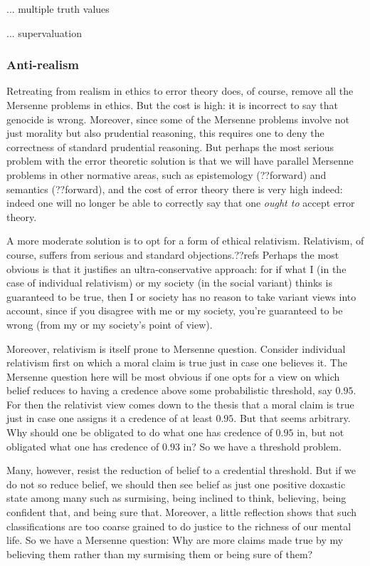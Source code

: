 ... multiple truth values

... supervaluation
\subsubsection{Anti-realism}
Retreating from realism in ethics to error theory does, of course, remove all the Mersenne problems in ethics. But the
cost is high: it is incorrect to say that genocide is wrong. Moreover, since some of the Mersenne problems involve not
just morality but also prudential reasoning, this requires one to deny the correctness of standard prudential reasoning.
But perhaps the most serious problem with the error theoretic solution is that we will have parallel Mersenne problems
in other normative areas, such as epistemology (??forward) and semantics (??forward), and the cost of error theory 
there is very high indeed: indeed one will no longer  be able to correctly say that one \textit{ought to} accept error theory.

A more moderate solution is to opt for a form of ethical relativism. Relativism, of course, suffers from serious and
standard objections.??refs Perhaps the most obvious is that it justifies an ultra-conservative approach: for if what
I (in the case of individual relativism) or my society (in the social variant) thinks is guaranteed to be true, then
I or society has no reason to take variant views into account, since if you disagree with me or my society, you're guaranteed to be 
wrong (from my or my society's point of view).

Moreover, relativism is itself prone to
Mersenne question. Consider individual relativism first on which a moral claim is true just in case one believes
it. The Mersenne question here will be most obvious if one opts for a view on which belief reduces to having a
credence above some probabilistic threshold, say $0.95$. For then the relativist view comes down to the thesis
that a moral claim is true just in case one assigns it a credence of at least $0.95$. But that seems arbitrary.
Why should one be obligated to do what one has credence of $0.95$ in, but not obligated what one has credence of $0.93$ in?
So we have a threshold problem.

Many, however, resist the reduction of belief to a credential threshold. But if we do not so reduce belief, we should
then see belief as just one positive doxastic state among many such as surmising, being inclined to think, believing,
being confident that, and being sure that. Moreover, a little reflection shows that
such classifications are too coarse grained to do justice to the richness of our mental life. So we have a Mersenne
question: Why are more claims made true by my believing them rather than my surmising them or being sure of them?

